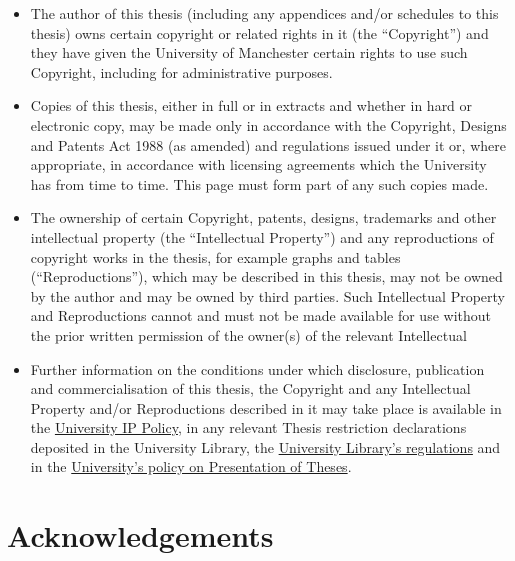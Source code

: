 \begin{justify}
\begin{itemize}
    \item The author of this thesis (including any appendices and/or schedules to this thesis) owns certain copyright or related rights in it (the “Copyright”) and they have given the University of Manchester certain rights to use such Copyright, including for administrative purposes.
    \item Copies of this thesis, either in full or in extracts and whether in hard or electronic copy, may be made only in accordance with the Copyright, Designs and Patents Act 1988 (as amended) and regulations issued under it or, where appropriate, in accordance with licensing agreements which the University has from time to time. This page must form part of any such copies made.
    \item The ownership of certain Copyright, patents, designs, trademarks and other intellectual property (the “Intellectual Property”) and any reproductions of copyright works in the thesis, for example graphs and tables (“Reproductions”), which may be described in this thesis, may not be owned by the author and may be owned by third parties. Such Intellectual Property and Reproductions cannot and must not be made available for use without the prior written permission of the owner(s) of the relevant Intellectual
    \item Further information on the conditions under which disclosure, publication and commercialisation of this thesis, the Copyright and any Intellectual Property and/or Reproductions described in it may take place is available in the \href{http://documents.manchester.ac.uk/DocuInfo.aspx?DocID=24420}{University IP Policy}, in any relevant Thesis restriction declarations deposited in the University Library, the  \href{http://www.library.manchester.ac.uk/about/regulations/}{University Library's regulations} and in the \href{https://documents.manchester.ac.uk/display.aspx?DocID=7420}{University's policy on Presentation of Theses}.
\end{itemize}





\clearpage
\thispagestyle{plain}

\vspace*{-2cm}  
\chapter{\fontsize{24pt}{20pt}\selectfont \textbf{Acknowledgements}}



\end{justify}
